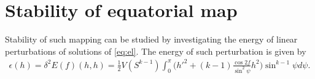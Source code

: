\section*{Stability of equatorial map}






Stability of such mapping can be studied by investigating the energy
of linear perturbations of solutions of \eqref{eq:el}. The energy of
such perturbation is given by
\begin{gather}\label{eq:infE}
  \epsilon(h)=\delta^2E(f)(h,h)=\frac{1}{2}V(S^{k-1})\int_0^{\pi}\bigg(h'^2+(k-1)\frac{\cos
    2f}{\sin^2\psi }h^2\bigg)\sin^{k-1}\psi d\psi.
\end{gather}





